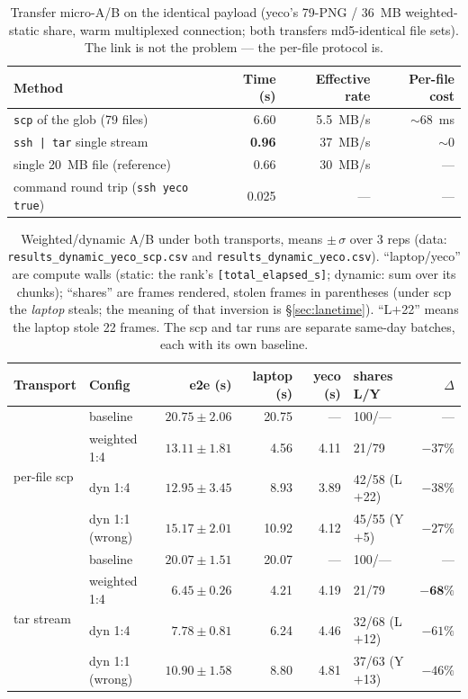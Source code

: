 \documentclass[
	english,
	letterpaper, oneside
]{article}
\begin{document}
\begin{table}[H]
\centering
\caption{Transfer micro-A/B on the identical payload (yeco's 79-PNG /
36~MB weighted-static share, warm multiplexed connection; both transfers
md5-identical file sets). The link is not the problem --- the per-file
protocol is.\label{tab:transport}}
\small
\begin{tabular}{lrrr}
\toprule
Method & Time (s) & Effective rate & Per-file cost \\
\midrule
\texttt{scp} of the glob (79 files) & 6.60 & 5.5~MB/s & $\sim$68~ms \\
\texttt{ssh | tar} single stream    & \textbf{0.96} & 37~MB/s & $\sim$0 \\
single 20~MB file (reference)       & 0.66 & 30~MB/s & --- \\
command round trip (\texttt{ssh yeco true}) & 0.025 & --- & --- \\
\bottomrule
\end{tabular}
\end{table}

\begin{table}[H]
\centering
\caption{Weighted/dynamic A/B under both transports, means $\pm\,\sigma$
over 3 reps (data: \texttt{results\_dynamic\_yeco\_scp.csv} and
\texttt{results\_dynamic\_yeco.csv}).
``laptop/yeco'' are compute walls (static: the rank's
\texttt{[total\_elapsed\_s]}; dynamic: sum over its chunks); ``shares''
are frames rendered, stolen frames in parentheses (under scp the
\emph{laptop} steals; the meaning of that inversion is
\S\ref{sec:lanetime}). ``L$+$22'' means the laptop stole 22 frames. The scp and tar runs are
separate same-day batches, each with its own
baseline.\label{tab:dynamic}}
\footnotesize
\setlength{\tabcolsep}{4.5pt}
\begin{tabular}{llrrrlr}
\toprule
Transport & Config & e2e (s) & laptop (s) & yeco (s) & shares L/Y & $\Delta$ \\
\midrule
\multirow{4}{*}{per-file scp}
 & baseline        & $20.75\pm2.06$ & 20.75 & --- & 100/--- & --- \\
 & weighted 1:4    & $13.11\pm1.81$ & 4.56 & 4.11 & 21/79 & $-37\%$ \\
 & dyn 1:4         & $12.95\pm3.45$ & 8.93 & 3.89 & 42/58 (L$+$22) & $-38\%$ \\
 & dyn 1:1 (wrong) & $15.17\pm2.01$ & 10.92 & 4.12 & 45/55 (Y$+$5) & $-27\%$ \\
\midrule
\multirow{4}{*}{tar stream}
 & baseline        & $20.07\pm1.51$ & 20.07 & --- & 100/--- & --- \\
 & weighted 1:4    & $\mathbf{6.45\pm0.26}$ & 4.21 & 4.19 & 21/79 & $\mathbf{-68\%}$ \\
 & dyn 1:4         & $7.78\pm0.81$ & 6.24 & 4.46 & 32/68 (L$+$12) & $-61\%$ \\
 & dyn 1:1 (wrong) & $10.90\pm1.58$ & 8.80 & 4.81 & 37/63 (Y$+$13) & $-46\%$ \\
\bottomrule
\end{tabular}
\end{table}
\end{document}
